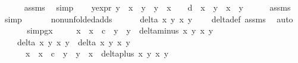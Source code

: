 \begin{isabellebody}
\ \ \ \ \isamarkupfalse%
\ assms{\isacharparenleft}{}{\isacharcomma}{}{\isacharparenright}\ \isamarkupfalse%
\ simp\isanewline
\ \ \isamarkupfalse%
\ y{}{\isacharprime}{\isacharunderscore}expr{\isacharcolon}\ {\isachardoublequoteopen}y{}{\isacharprime}\ {\isacharequal}\ {\isacharparenleft}x{}\ {\isacharasterisk}\ y{}\ {\isacharplus}\ y{}\ {\isacharasterisk}\ x{}{\isacharparenright}\ {\isacharslash}\ {\isacharparenleft}{}\ {\isacharplus}\ d\ {\isacharasterisk}\ x{}\ {\isacharasterisk}\ y{}\ {\isacharasterisk}\ x{}\ {\isacharasterisk}\ y{}{\isacharparenright}{\isachardoublequoteclose}\isanewline
\ \ \ \ \isamarkupfalse%
\ assms{\isacharparenleft}{}{\isacharcomma}{}{\isacharparenright}\ \isamarkupfalse%
\ simp\isanewline
\ \ \isanewline
\ \ \isamarkupfalse%
\ non{\isacharunderscore}unfolded{\isacharunderscore}adds{\isacharcolon}\isanewline
\ \ \ \ \ \ {\isachardoublequoteopen}delta\ x{}\ y{}\ x{}\ y{}\ {\isasymnoteq}\ {}{\isachardoublequoteclose}\ \isamarkupfalse%
\ delta{\isacharunderscore}def\ assms{\isacharparenleft}{}{\isacharcomma}{}{\isacharparenright}\ \isamarkupfalse%
\ auto\isanewline
\ \ \isanewline
\ \ \isamarkupfalse%
\ simp{}gx{\isacharcolon}\ {\isachardoublequoteopen}\isanewline
\ \ \ \ {\isacharparenleft}x{}{\isacharprime}\ {\isacharasterisk}\ x{}\ {\isacharminus}\ c\ {\isacharasterisk}\ y{}{\isacharprime}\ {\isacharasterisk}\ y{}{\isacharparenright}\ {\isacharasterisk}\ delta{\isacharunderscore}minus\ x{}\ y{}\ x{}{\isacharprime}\ y{}{\isacharprime}\ {\isacharasterisk}\ \isanewline
\ \ \ \ {\isacharparenleft}delta\ x{}\ y{}\ x{}\ y{}\ {\isacharasterisk}\ delta\ x{}\ y{}\ x{}\ y{}{\isacharparenright}\ {\isacharequal}\ \isanewline
\ \ \ \ \ \ {\isacharparenleft}{\isacharparenleft}x{}\ {\isacharasterisk}\ x{}\ {\isacharminus}\ c\ {\isacharasterisk}\ y{}\ {\isacharasterisk}\ y{}{\isacharparenright}\ {\isacharasterisk}\ x{}\ {\isacharasterisk}\ delta{\isacharunderscore}plus\ x{}\ y{}\ x{}\ y{}\ {\isacharminus}\ \isanewline

\end{isabellebody}

